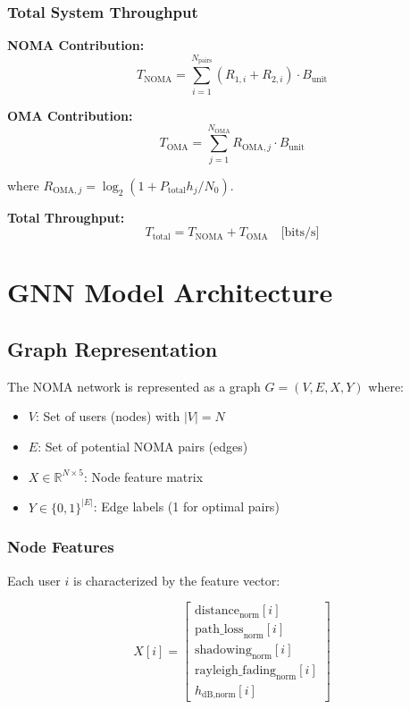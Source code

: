 \documentclass[11pt,a4paper]{article}
\begin{document}
\subsubsection{Total System Throughput}

\textbf{NOMA Contribution:}
\begin{equation}
T_{\text{NOMA}} = \sum_{i=1}^{N_{\text{pairs}}} (R_{1,i} + R_{2,i}) \cdot B_{\text{unit}}
\end{equation}

\textbf{OMA Contribution:}
\begin{equation}
T_{\text{OMA}} = \sum_{j=1}^{N_{\text{OMA}}} R_{\text{OMA},j} \cdot B_{\text{unit}}
\end{equation}

where $R_{\text{OMA},j} = \log_2(1 + P_{\text{total}} h_j / N_0)$.

\textbf{Total Throughput:}
\begin{equation}
T_{\text{total}} = T_{\text{NOMA}} + T_{\text{OMA}} \quad \text{[bits/s]}
\end{equation}

\section{GNN Model Architecture}

\subsection{Graph Representation}

The NOMA network is represented as a graph $G = (V, E, X, Y)$ where:

\begin{itemize}
    \item $V$: Set of users (nodes) with $|V| = N$
    \item $E$: Set of potential NOMA pairs (edges)
    \item $X \in \mathbb{R}^{N \times 5}$: Node feature matrix
    \item $Y \in \{0,1\}^{|E|}$: Edge labels (1 for optimal pairs)
\end{itemize}

\subsubsection{Node Features}

Each user $i$ is characterized by the feature vector:

\begin{equation}
X[i] = \begin{bmatrix}
\text{distance}_{\text{norm}}[i] \\
\text{path\_loss}_{\text{norm}}[i] \\
\text{shadowing}_{\text{norm}}[i] \\
\text{rayleigh\_fading}_{\text{norm}}[i] \\
h_{\text{dB,norm}}[i]
\end{bmatrix}
\end{equation}
\end{document}
